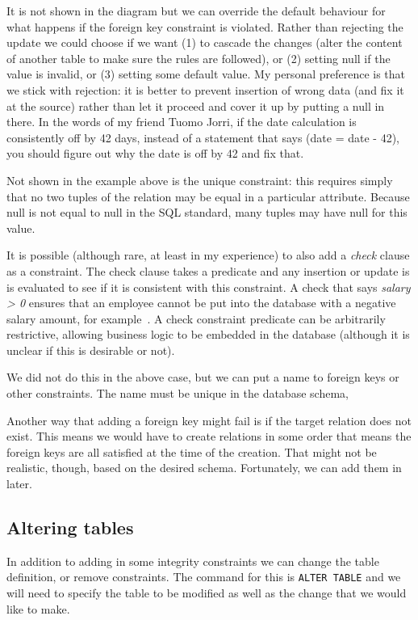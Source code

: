 It is not shown in the diagram but we can override the default behaviour for what happens if the foreign key constraint is violated. Rather than rejecting the update we could choose if we want (1) to cascade the changes (alter the content of another table to make sure the rules are followed), or (2) setting null if the value is invalid, or (3) setting some default value. My personal preference is that we stick with rejection: it is better to prevent insertion of wrong data (and fix it at the source) rather than let it proceed and cover it up by putting a null in there. In the words of my friend Tuomo Jorri, if the date calculation is consistently off by 42 days, instead of a statement that says (date = date - 42), you should figure out why the date is off by 42 and fix that.

Not shown in the example above is the unique constraint: this requires simply that no two tuples of the relation may be equal in a particular attribute. Because null is not equal to null in the SQL standard, many tuples may have null for this value.

It is possible (although rare, at least in my experience) to also add a \textit{check} clause as a constraint. The check clause takes a predicate and any insertion or update is is evaluated to see if it is consistent with this constraint. A check that says \textit{salary > 0} ensures that an employee cannot be put into the database with a negative salary amount, for example~\cite{dsc}. A check constraint predicate can be arbitrarily restrictive, allowing business logic to be embedded in the database (although it is unclear if this is desirable or not).

We did not do this in the above case, but we can put a name to foreign keys or other constraints. The name must be unique in the database schema, 

Another way that adding a foreign key might fail is if the target relation does not exist. This means we would have to create relations in some order that means the foreign keys are all satisfied at the time of the creation. That might not be realistic, though, based on the desired schema. Fortunately, we can add them in later.

\subsection*{Altering tables}

In addition to adding in some integrity constraints we can change the table definition, or remove constraints. The command for this is \texttt{ALTER TABLE} and we will need to specify the table to be modified as well as the change that we would like to make. 

